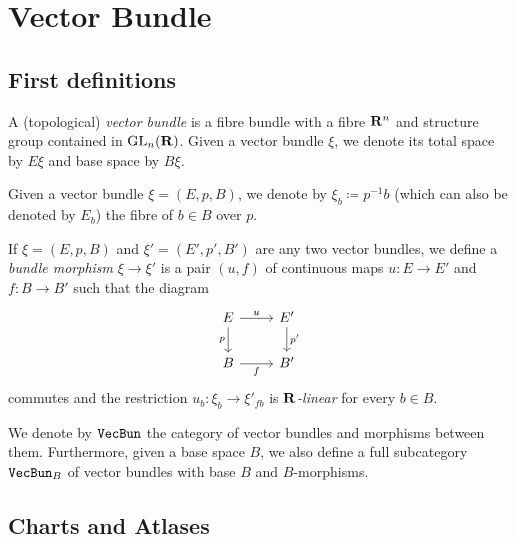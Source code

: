 \documentclass[../../../deep-dive]{subfile}
\begin{document}
\section{Vector Bundle}

\subsection{First definitions}

\begin{definition}
    \label{def:vector-bundle}
    A (topological) \emph{vector bundle} is a fibre bundle with a fibre \(\mathbf{R}^n\) and
    structure group contained in \(\operatorname{GL}_n(\mathbf{R})\). Given a vector bundle \(\xi\), we
    denote its total space by \(E \xi\) and base space by \(B \xi\).
\end{definition}

\begin{notation}
    \label{not:fibre-of-vector-bundle}
    Given a vector bundle \(\xi = (E, p, B)\), we denote by
    \(\xi_b \coloneq p^{-1} b\) (which can also be denoted by \(E_b\)) the fibre of
    \(b \in B\) over \(p\).
\end{notation}

\begin{definition}
    \label{def:morphism-vector-bundles}
    If \(\xi = (E, p, B)\) and \(\xi' = (E', p', B')\) are any two vector bundles,
    we define a \emph{bundle morphism} \(\xi \to \xi'\) is a pair \((u, f)\) of
    continuous maps \(u: E \to E'\) and \(f: B \to B'\) such that the diagram
    \[
        \begin{tikzcd}
            E \ar[d, "p"'] \ar[r, "u"] &E' \ar[d, "p'"] \\
            B \ar[r, "f"'] &B'
        \end{tikzcd}
    \]
    commutes and the restriction \(u_b: \xi_b \to \xi'_{f b}\) is
    \emph{\(\mathbf{R}\)-linear} for every \(b \in B\).
\end{definition}

\begin{definition}
    \label{def:vector-bundle-category}
    We denote by \({\texttt{VecBun}}\) the category of vector bundles and morphisms between
    them. Furthermore, given a base space \(B\), we also define a full subcategory
    \({\texttt{VecBun}}_B\) of vector bundles with base \(B\) and \(B\)-morphisms.
\end{definition}

\subsection{Charts and Atlases}
\end{document}
